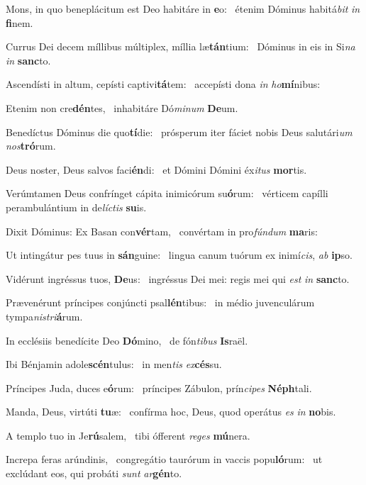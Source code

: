 \item Mons, in quo beneplácitum est Deo habitáre in \textbf{e}o:~\psstar{} étenim Dóminus habitá\textit{bit} \textit{in} \textbf{fi}nem.
\item Currus Dei decem míllibus múltiplex, míllia læ\textbf{tán}tium:~\psstar{} Dóminus in eis in Si\textit{na} \textit{in} \textbf{sanc}to.
\item Ascendísti in altum, cepísti captivi\textbf{tá}tem:~\psstar{} accepísti dona \textit{in} \textit{ho}\textbf{mí}nibus:
\item Etenim non cre\textbf{dén}tes,~\psstar{} inhabitáre Dó\textit{minum} \textbf{De}um.
\item Benedíctus Dóminus die quo\textbf{tí}die:~\psstar{} prósperum iter fáciet nobis Deus salutári\textit{um} \textit{nos}\textbf{tró}rum.
\item Deus noster, Deus salvos faci\textbf{én}di:~\psstar{} et Dómini Dómini éx\textit{itus} \textbf{mor}tis.
\item Verúmtamen Deus confrínget cápita inimicórum su\textbf{ó}rum:~\psstar{} vérticem capílli perambulántium in de\textit{líctis} \textbf{su}is.
\item Dixit Dóminus: Ex Basan con\textbf{vér}tam,~\psstar{} convértam in pro\textit{fúndum} \textbf{ma}ris:
\item Ut intingátur pes tuus in \textbf{sán}guine:~\psstar{} lingua canum tuórum ex inimí\textit{cis}, \textit{ab} \textbf{ip}so.
\item Vidérunt ingréssus tuos, \textbf{De}us:~\psstar{} ingréssus Dei mei: regis mei qui \textit{est} \textit{in} \textbf{sanc}to.
\item Prævenérunt príncipes conjúncti psal\textbf{lén}tibus:~\psstar{} in médio juvenculárum tympa\textit{nistri}\textbf{á}rum.
\item In ecclésiis benedícite Deo \textbf{Dó}mino,~\psstar{} de fón\textit{tibus} \textbf{Is}raël.
\item Ibi Bénjamin adole\textbf{scén}tu\-lus:~\psstar{} in men\textit{tis} \textit{ex}\textbf{cés}su.
\item Príncipes Juda, duces e\textbf{ó}rum:~\psstar{} príncipes Zábulon, prín\textit{cipes} \textbf{Néph}tali.
\item Manda, Deus, virtúti \textbf{tu}æ:~\psstar{} confírma hoc, Deus, quod operátus \textit{es} \textit{in} \textbf{no}bis.
\item A templo tuo in Je\textbf{rú}salem,~\psstar{} tibi ófferent \textit{reges} \textbf{mú}nera.
\item Increpa feras arúndinis,~\pscross{} congregátio taurórum in vaccis popu\textbf{ló}rum:~\psstar{} ut exclúdant eos, qui probáti \textit{sunt} \textit{ar}\textbf{gén}to.
